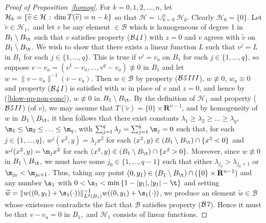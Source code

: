 \documentclass[a4paper,11pt]{amsart}
\begin{document}
\begin{proof}[Proof of Proposition~\ref{homog}]
For $k=0, 1, 2, \ldots, n$, let ${\mathcal H}_{k} = \{ \widetilde{v} \in {\mathcal H} \, : \, {\rm dim} \, T(\widetilde{v}) = n-k\}$ so that ${\mathcal H} = \cup_{k=0}^{n} {\mathcal H}_{k}.$ Clearly ${\mathcal H}_{0} = \{0\}.$ Let $\widetilde{v} \in {\mathcal H}_{1},$ and let $v$ be any element $\in {\mathcal B}$ which is homogeneous of degree 1 in $B_{1} \setminus B_{\t}$ 
such that $v$ satisfies property (${\mathcal B}{\emph 4 \, I}$) with $z = 0$ and $v$ agrees with $\widetilde{v}$ on $B_{1} \setminus B_{\t}$. We wish to show that there exists a linear function $L$ such that $v^{j} = L$ in $B_{1}$ for each $j \in \{1, \ldots, q\}.$ This is true if $v^{j} = v_{a}$ on $B_{1}$ for each $j \in \{1, \ldots, q\}$, so suppose $v - v_{a} = (v^{1} - v_{a}, \ldots, v^{q} - v_{a}) \not\equiv 0$ in $B_{1}$ and let  $w = \|v -v_{a}\|^{-1}(v - v_{a}).$ Then $w \in {\mathcal B}$ by property (${\mathcal B}{\emph 5 \, III}$), $w \not\equiv 0$, $w_{a} \equiv 0$ and property (${\mathcal B}{\emph 4 \, I}$) is satisfied with $w$ in place of $v$ and $z = 0$, and   hence by (\ref{blow-up-non-conc}), $w \not\equiv 0$ in $B_{1} \setminus B_{\t}.$ By the definition of ${\mathcal H}_{1}$ and property (${\mathcal B{\emph 5 \, II}}$) (of $v$), we may assume that $T(\widetilde{v}) = \{0\} \times {\mathbf R}^{n-1}$, and by homogeneity of $w$ in $B_{1} \setminus B_{\t},$ it then follows that there exist constants $\lambda_{1} \geq \lambda_{2} \geq \ldots \geq  \lambda_{q}$, $\m_{1} \leq \m_{2} \leq  \ldots \leq\m_{q}$, with $\sum_{j=1}^{q} \lambda_{j}= \sum_{j=1}^{q}\m_{j} = 0$ such that, for each $j \in \{1, \ldots, q\}$,   
$w^{j}(x^{2}, y) = \lambda_{j}x^{2}$ for each $(x^{2}, y) \in (B_{1} \setminus B_{\t}) \cap \{x^{2} < 0\}$ and 
$w^{j}(x^{2}, y) = \m_{j}x^{2}$ for each $(x^{2}, y) \in (B_{1} \setminus B_{\t}) \cap \{x^{2} > 0\}.$ Moreover, since $w \not\equiv 0$ in $B_{1} \setminus B_{\t}$, we must have some $j_{0} \in \{1, \ldots, q-1\}$ such that either $\lambda_{j_{0}}  > \lambda_{j_{0}+1}$ or 
$\m_{j_{0}} < \m_{j_{0}+1}$. Thus, taking any point $(0, y_{1}) \in (B_{1} \setminus B_{\t}) \cap (\{0\} \times {\mathbf R}^{n-1})$ and
any number $\s_{1}$ with $0 < \s_{1} < {\rm min} \, \{1 - |y_{1}|, |y_{1}| - \t\}$ and setting $\widetilde{w} = \|w((0, y_{1}) + \s_{1}(\cdot))\|_{L^{2}(B_{1})}^{-1}w((0, y_{1}) + \s_{1}(\cdot))$, we produce an element $\widetilde{w} \in {\mathcal B}$ whose 
existence contradicts the fact that ${\mathcal B}$ satisfies property (${\mathcal B}{\emph 7}$). Hence it must be that $v- v_{a} = 0$ in $B_{1},$ and ${\mathcal H}_{1}$ consists of linear functions. 


\end{proof}
\end{document}
